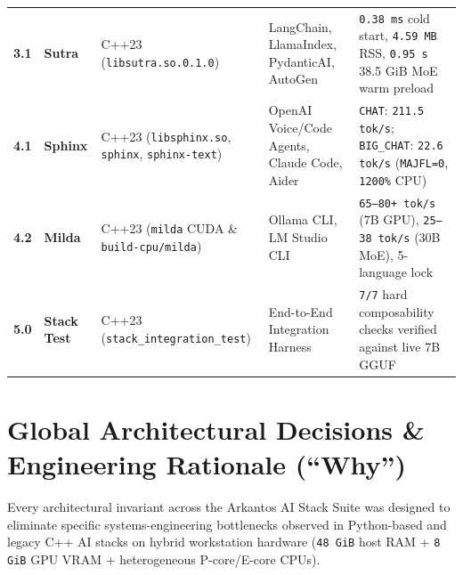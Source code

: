 \documentclass[11pt,a4paper]{article}
\begin{document}
\begin{small}
\begin{tabularx}{\textwidth}{cllYY}
\addlinespace[2pt]
\textbf{3.1} & \textbf{Sutra} & C++23 (\texttt{libsutra.so.0.1.0}) & LangChain, LlamaIndex, PydanticAI, AutoGen & \texttt{0.38 ms} cold start, \texttt{4.59 MB} RSS, \texttt{0.95 s} 38.5 GiB MoE warm preload \\
\addlinespace[2pt]
\textbf{4.1} & \textbf{Sphinx} & C++23 (\texttt{libsphinx.so}, \texttt{sphinx}, \texttt{sphinx-text}) & OpenAI Voice/Code Agents, Claude Code, Aider & \texttt{CHAT}: \texttt{211.5 tok/s}; \texttt{BIG\_CHAT}: \texttt{22.6 tok/s} (\texttt{MAJFL=0}, \texttt{1200\%} CPU) \\
\addlinespace[2pt]
\textbf{4.2} & \textbf{Milda} & C++23 (\texttt{milda} CUDA \& \texttt{build-cpu/milda}) & Ollama CLI, LM Studio CLI & \texttt{65--80+ tok/s} (7B GPU), \texttt{25--38 tok/s} (30B MoE), 5-language lock \\
\addlinespace[2pt]
\textbf{5.0} & \textbf{Stack Test} & C++23 (\texttt{stack\_integration\_test}) & End-to-End Integration Harness & \texttt{7/7} hard composability checks verified against live 7B GGUF \\
\bottomrule
\end{tabularx}
\end{small}

\section{Global Architectural Decisions \& Engineering Rationale (``Why'')}

Every architectural invariant across the Arkantos AI Stack Suite was designed to eliminate specific systems-engineering bottlenecks observed in Python-based and legacy C++ AI stacks on hybrid workstation hardware (\texttt{48 GiB} host RAM + \texttt{8 GiB} GPU VRAM + heterogeneous P-core/E-core CPUs).
\end{document}
